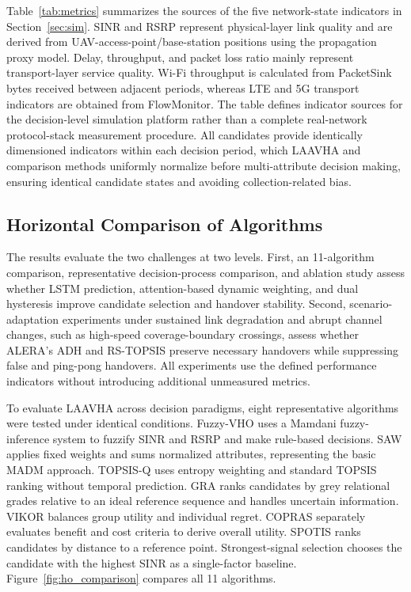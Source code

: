 \documentclass[remotesensing,article,submit,moreauthors]{Definitions/mdpi}
\begin{document}
Table~\ref{tab:metrics} summarizes the sources of the five network-state indicators in Section~\ref{sec:sim}. SINR and RSRP represent physical-layer link quality and are derived from UAV-access-point/base-station positions using the propagation proxy model. Delay, throughput, and packet loss ratio mainly represent transport-layer service quality. Wi-Fi throughput is calculated from PacketSink bytes received between adjacent periods, whereas LTE and 5G transport indicators are obtained from FlowMonitor. The table defines indicator sources for the decision-level simulation platform rather than a complete real-network protocol-stack measurement procedure. All candidates provide identically dimensioned indicators within each decision period, which LAAVHA and comparison methods uniformly normalize before multi-attribute decision making, ensuring identical candidate states and avoiding collection-related bias.

\subsection{Horizontal Comparison of Algorithms}\label{sec:hcomp}

The results evaluate the two challenges at two levels. First, an 11-algorithm comparison, representative decision-process comparison, and ablation study assess whether LSTM prediction, attention-based dynamic weighting, and dual hysteresis improve candidate selection and handover stability. Second, scenario-adaptation experiments under sustained link degradation and abrupt channel changes, such as high-speed coverage-boundary crossings, assess whether ALERA's ADH and RS-TOPSIS preserve necessary handovers while suppressing false and ping-pong handovers. All experiments use the defined performance indicators without introducing additional unmeasured metrics.

To evaluate LAAVHA across decision paradigms, eight representative algorithms were tested under identical conditions. Fuzzy-VHO uses a Mamdani fuzzy-inference system to fuzzify SINR and RSRP and make rule-based decisions. SAW applies fixed weights and sums normalized attributes, representing the basic MADM approach. TOPSIS-Q uses entropy weighting and standard TOPSIS ranking without temporal prediction. GRA ranks candidates by grey relational grades relative to an ideal reference sequence and handles uncertain information. VIKOR balances group utility and individual regret. COPRAS separately evaluates benefit and cost criteria to derive overall utility. SPOTIS ranks candidates by distance to a reference point. Strongest-signal selection chooses the candidate with the highest SINR as a single-factor baseline. Figure~\ref{fig:ho_comparison} compares all 11 algorithms.
\end{document}
